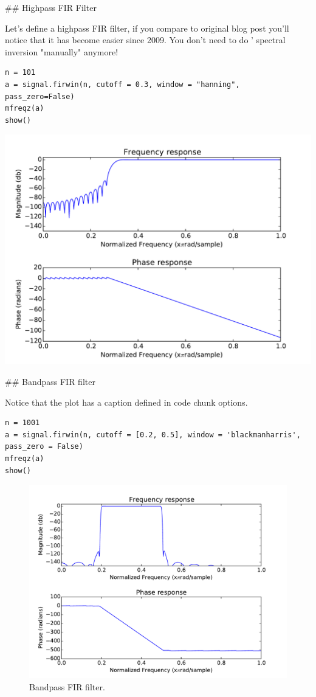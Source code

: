 ## Highpass FIR Filter

Let's define a highpass FIR filter, if you compare to original blog
post you'll notice that it has become easier since 2009. You don't
need to do ' spectral inversion "manually" anymore!



\begin{verbatim}
n = 101
a = signal.firwin(n, cutoff = 0.3, window = "hanning",
pass_zero=False)
mfreqz(a)
show()
\end{verbatim}
\includegraphics[width= \linewidth]{figures/untiled2_figure3_1.pdf}


## Bandpass FIR filter

Notice that the plot has a caption defined in code chunk options.



\begin{verbatim}
n = 1001
a = signal.firwin(n, cutoff = [0.2, 0.5], window = 'blackmanharris',
pass_zero = False)
mfreqz(a)
show()
\end{verbatim}
\begin{figure}[htpb]
\center
\includegraphics[width= \linewidth]{figures/untiled2_figure4_1.pdf}
\caption{Bandpass FIR filter.}
\label{fig:None}
\end{figure}

